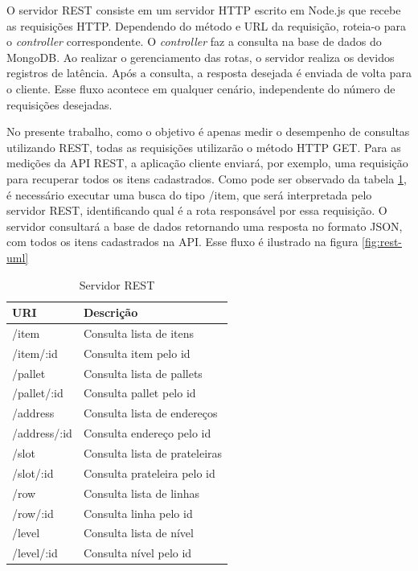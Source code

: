O servidor REST consiste em um servidor HTTP escrito em Node.js que recebe as requisições HTTP. Dependendo do método e URL da requisição, roteia-o para o \textit{controller} correspondente. O \textit{controller} faz a consulta na base de dados do MongoDB. Ao realizar o gerenciamento das rotas, o servidor realiza os devidos registros de latência. Após a consulta, a resposta desejada é enviada de volta para o cliente. Esse fluxo acontece em qualquer cenário, independente do número de requisições desejadas.

No presente trabalho, como o objetivo é apenas medir o desempenho de consultas utilizando REST, todas as requisições utilizarão o método HTTP GET. Para as medições da API REST, a aplicação cliente enviará, por exemplo, uma requisição para recuperar todos os itens cadastrados. Como pode ser observado da tabela \ref{tab:rest-url}, é necessário executar uma busca do tipo \textup{/item}, que será interpretada pelo servidor REST, identificando qual é a rota responsável por essa requisição. O servidor consultará a base de dados retornando uma resposta no formato JSON, com todos os itens cadastrados na API. Esse fluxo é ilustrado na figura \ref{fig:rest-uml}

\begin{table}[htbp]
    \centering
    \begin{tabular}{| l | l |}
        \hline
        \textbf{URI} & \textbf{Descrição} \\ \hline
        /item & Consulta lista de itens \\ \hline
        /item/:id & Consulta item pelo id \\ \hline
        /pallet & Consulta lista de pallets  \\ \hline
        /pallet/:id & Consulta pallet pelo id  \\ \hline
        /address & Consulta lista de endereços \\ \hline
        /address/:id & Consulta endereço pelo id \\ \hline
        /slot & Consulta lista de prateleiras \\ \hline
        /slot/:id & Consulta prateleira pelo id \\ \hline
        /row & Consulta lista de linhas \\ \hline
        /row/:id & Consulta linha pelo id \\ \hline
        /level & Consulta lista de nível \\ \hline
        /level/:id & Consulta nível pelo id \\ \hline
    \end{tabular}
    \caption{Servidor REST} \label{tab:rest-url}
\end{table}

